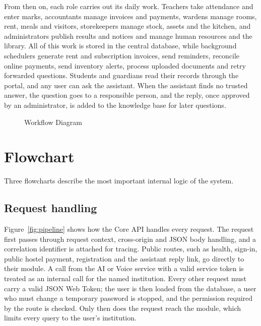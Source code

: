 From then on, each role carries out its daily work. Teachers take attendance and enter marks, accountants manage invoices and payments, wardens manage rooms, rent, meals and visitors, storekeepers manage stock, assets and the kitchen, and administrators publish results and notices and manage human resources and the library. All of this work is stored in the central database, while background schedulers generate rent and subscription invoices, send reminders, reconcile online payments, send inventory alerts, process uploaded documents and retry forwarded questions. Students and guardians read their records through the portal, and any user can ask the assistant. When the assistant finds no trusted answer, the question goes to a responsible person, and the reply, once approved by an administrator, is added to the knowledge base for later questions.

\vspace{0.5cm}

{
  \begin{figure}[!htbp]
    \centering
    \caption{Workflow Diagram}
    \label{fig:workflow}
  \end{figure}
}

\section{Flowchart}
Three flowcharts describe the most important internal logic of the system.

\subsection{Request handling}
Figure~\ref{fig:pipeline} shows how the Core API handles every request. The request first passes through request context, cross-origin and JSON body handling, and a correlation identifier is attached for tracing. Public routes, such as health, sign-in, public hostel payment, registration and the assistant reply link, go directly to their module. A call from the AI or Voice service with a valid service token is treated as an internal call for the named institution. Every other request must carry a valid JSON Web Token; the user is then loaded from the database, a user who must change a temporary password is stopped, and the permission required by the route is checked. Only then does the request reach the module, which limits every query to the user's institution.

